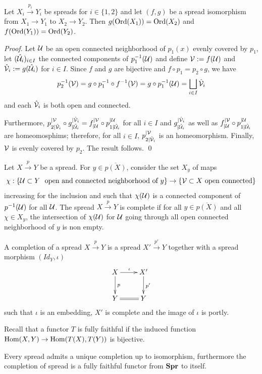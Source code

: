 \begin{lem}\label{lem:ord_iso} Let $X_i\xrightarrow{p_i} Y_i$ be spreads for $i\in \{1,2\}$ and let $(f,g)$ be a spread isomorphism from $X_1\rightarrow Y_1$ to $X_2\rightarrow Y_2$. Then $g(\mathrm{Ord}(X_1)) = \mathrm{Ord}(X_2)$ and $f(\mathrm{Ord}(Y_1)) = \mathrm{Ord}(Y_2)$.
 
\end{lem}
\begin{proof}
 Let $\mathcal{U}$ be an open connected neighborhood of $p_1(x)$ evenly covered by $p_1$, let $(\hat{\mathcal{U}}_i)_{i\in I}$ the connected components of $p_1^{-1}(\mathcal{U})$ and define $\mathcal V:=f(\mathcal{U})$ and $\hat {\mathcal V}_i:= g(\hat {\mathcal{U}}_i)$ for $i\in I$. 
 Since $f$ and $g$ are bijective and $f\circ p_1=p_2\circ g$, we have $$p_2^{-1}(\mathcal V)=g\circ p_1^{-1}\circ f^{-1}(\mathcal V) = g\circ p_1^{-1}(\mathcal{U}) = \bigsqcup_{i\in I} \hat {\mathcal V}_i$$   
 and each $\hat {\mathcal V}_i$ is both open and connected.
 
 Furthermore, $p_{2|\hat{\mathcal V}_i}^{|\mathcal V}\circ g^{|\hat{\mathcal V}_i}_{|\hat{\mathcal{U}}_i} = f_{|\mathcal{U}}^{|\mathcal V}\circ p_{1|
 \hat{\mathcal{U}}_i}^{|\mathcal{U}}$ for all $i\in I$ and $g^{|\hat{\mathcal V}_i}_{|\hat{\mathcal{U}}_i}$ as well as $f_{|\mathcal{U}}^{|\mathcal V}\circ p_{1|
 \hat{\mathcal{U}}_i}^{|\mathcal{U}}$ are homeomosphims; therefore, for all $i\in I$, $p_{2|\hat{\mathcal V}_i}^{|\mathcal V}$ is an homeomorphism.
 Finally, $\mathcal V$ is evenly covered by $p_2$. The result follows.
 \qed\end{proof}

\begin{defi} Let  $X\xrightarrow{p} Y$ be a spread. For $y\in \overline{p(X)}$, consider the set $X_y$ of maps $$\chi : \{\mathcal{U}\subset Y ~ \text{ open and connected neighborhood of }y\} \rightarrow \{\mathcal V\subset X ~ \text{open connected}\}$$ increasing for the inclusion and such that  $\chi(\mathcal{U})$ is a connected component of $p^{-1}(\mathcal{U})$ for all $\mathcal{U}$.
The spread $X\xrightarrow{p} Y$ is complete if for all $y\in \overline{p(X)}$ and all $\chi \in X_y$, the intersection of $\chi(\mathcal{U})$ for $\mathcal{U}$ going through all open connected neighborhood of $y$ is non empty.


A completion of a spread $X\xrightarrow{p} Y$ is a spread $X'\xrightarrow{p'} Y$ together with a spread morphism $(Id_Y,\iota)$
$$\xymatrix{
X\ar[d]^p \ar[r]^\iota & X' \ar[d]^{p'} \\ Y \ar@{=}[r] & Y
} $$
such that $\iota$ is an embedding, $X'$ is complete and the image of $\iota$ is portly.
\end{defi}
Recall that a functor $T$ is fully faithful if the induced function $\mathrm{Hom}(X,Y) \rightarrow \mathrm{Hom}(T(X),T(Y))$ is bijective.
\begin{thm}[\cite{MR0123298,MR2198590}] \label{theo:Fox_completion_functor}
 Every spread admits a unique completion up to isomorphism, furthermore the completion of spread is a fully faithful functor  from $\mathbf{Spr}$ to itself.
\end{thm}



